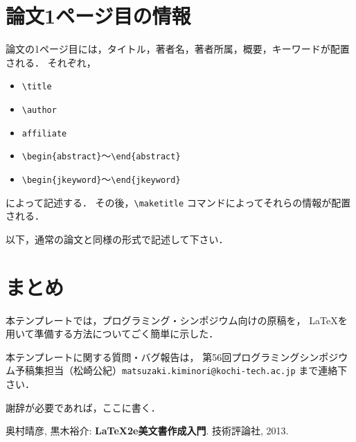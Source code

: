 \documentclass{ipsjprosym}
\begin{document}
\section{論文1ページ目の情報}

論文の1ページ目には，タイトル，著者名，著者所属，概要，キーワードが配置される．
それぞれ，
\begin{itemize}
\item \verb|\title|
\item \verb|\author|
\item \verb|affiliate|
\item \verb|\begin{abstract}|～\verb|\end{abstract}|
\item \verb|\begin{jkeyword}|～\verb|\end{jkeyword}|
\end{itemize}
によって記述する．
その後，\verb|\maketitle| コマンドによってそれらの情報が配置される．

以下，通常の論文と同様の形式で記述して下さい．

\section{まとめ}

本テンプレートでは，プログラミング・シンポジウム向けの原稿を，
\LaTeX を用いて準備する方法についてごく簡単に示した．

本テンプレートに関する質問・バグ報告は，
第56回プログラミングシンポジウム予稿集担当（松崎公紀）\verb|matsuzaki.kiminori@kochi-tech.ac.jp|
まで連絡下さい．

\begin{acknowledgment}
謝辞が必要であれば，ここに書く．
\end{acknowledgment}

% 
% 

\begin{thebibliography}{9}
 奥村晴彦, 黒木裕介: \textbf{LaTeX2e美文書作成入門}. 技術評論社, 2013.
\end{thebibliography}
\end{document}
